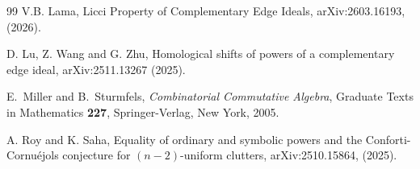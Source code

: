 \documentclass[12pt]{amsart}
\begin{document}
\begin{thebibliography}{99}
 V.B. Lama,
Licci Property of Complementary Edge Ideals,
arXiv:2603.16193, (2026).

                 D. Lu, Z. Wang and G. Zhu,
Homological shifts of powers of a complementary edge ideal,
arXiv:2511.13267 (2025).

 E.~Miller and B.~Sturmfels, \emph{Combinatorial Commutative Algebra}, Graduate Texts in Mathematics \textbf{227}, Springer-Verlag, New York, 2005.


 A. Roy and K. Saha, 
Equality of ordinary and symbolic powers and the Conforti-Cornuéjols conjecture for $(n-2)$-uniform clutters, 
arXiv:2510.15864, (2025). 

\end{thebibliography}
			
		
\end{document}
